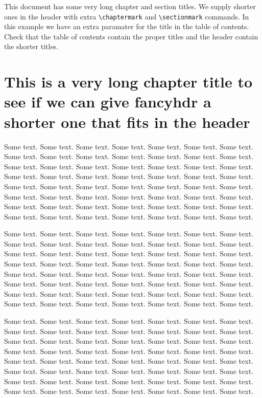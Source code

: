 \documentclass[oneside]{book}
\begin{document}
\thispagestyle{plain}
\tableofcontents

\bigskip

This document has some very long chapter and section titles. We supply shorter ones in the header with extra \verb|\chaptermark| and \verb|\sectionmark| commands. In this example we have an extra paramater for the title in the table of contents.
Check that the table of contents contain the proper titles and the header contain the shorter titles.

\chapter{This is a very long chapter title to see if we can give fancyhdr a shorter one that fits in the header}
\pagestyle{fancy}
\thispagestyle{fancy}

Some text. Some text. Some text. Some text. Some text. Some text. Some text. Some text. Some text. Some text. Some text. Some text. Some text. Some text. Some text. Some text. Some text. Some text. Some text. Some text. Some text. Some text. Some text. Some text. Some text. Some text. Some text. Some text. Some text. Some text. Some text. Some text. Some text. Some text. Some text. Some text. Some text. Some text. Some text. Some text. Some text. Some text. Some text. Some text. Some text. Some text. Some text. Some text. Some text. Some text. Some text. Some text. Some text. Some text. Some text. Some text. 

Some text. Some text. Some text. Some text. Some text. Some text. Some text. Some text. Some text. Some text. Some text. Some text. Some text. Some text. Some text. Some text. Some text. Some text. Some text. Some text. Some text. Some text. Some text. Some text. Some text. Some text. Some text. Some text. Some text. Some text. Some text. Some text. Some text. Some text. Some text. Some text. Some text. Some text. Some text. Some text. Some text. Some text. Some text. Some text. Some text. Some text. Some text. Some text. Some text. Some text. Some text. Some text. Some text. Some text. Some text. Some text. 

Some text. Some text. Some text. Some text. Some text. Some text. Some text. Some text. Some text. Some text. Some text. Some text. Some text. Some text. Some text. Some text. Some text. Some text. Some text. Some text. Some text. Some text. Some text. Some text. Some text. Some text. Some text. Some text. Some text. Some text. Some text. Some text. Some text. Some text. Some text. Some text. Some text. Some text. Some text. Some text. Some text. Some text. Some text. Some text. Some text. Some text. Some text. Some text. Some text. Some text. Some text. Some text. Some text. Some text. Some text. Some text. 
\end{document}
